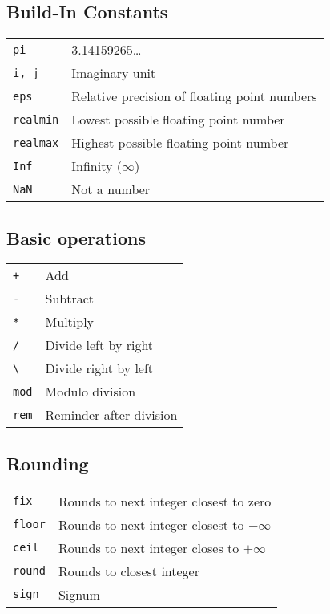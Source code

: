\subsection{Build-In Constants}
\begin{tabular}{@{}p{\the\MyLenA}%
		@{}p{\linewidth-\the\MyLenA}}
  \texttt{pi} & 3.14159265\dots\\
  \texttt{i, j}& Imaginary unit\\
  \texttt{eps}& Relative precision of floating point numbers\\
  \texttt{realmin} & Lowest possible floating point number\\
  \texttt{realmax} & Highest possible floating point number\\
  \texttt{Inf} & Infinity ($\infty$)\\
  \texttt{NaN} & Not a number\\
\end{tabular}

\subsection{Basic operations}
\begin{tabular}{@{}p{\the\MyLenA}%
		@{}p{\linewidth-\the\MyLenA}}
  \texttt{+} & Add\\
  \texttt{-}& Subtract\\
  \texttt{*}& Multiply\\
  \texttt{/} & Divide left by right\\
  \texttt{\textbackslash} & Divide right by left\\
  \texttt{mod} & Modulo division\\
  \texttt{rem} & Reminder after division\\
\end{tabular}

\subsection{Rounding}
\begin{tabular}{@{}p{\the\MyLenA}%
		@{}p{\linewidth-\the\MyLenA}}
  \texttt{fix} & Rounds to next integer closest to zero\\
  \texttt{floor}& Rounds to next integer closest to $-\infty$\\
  \texttt{ceil}& Rounds to next integer closes to $+ \infty$\\
  \texttt{round} & Rounds to closest integer\\
  \texttt{sign} & Signum\\
\end{tabular}

